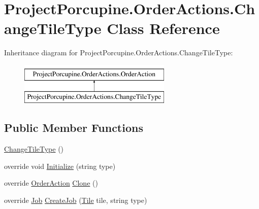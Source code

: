 \hypertarget{class_project_porcupine_1_1_order_actions_1_1_change_tile_type}{}\section{Project\+Porcupine.\+Order\+Actions.\+Change\+Tile\+Type Class Reference}
\label{class_project_porcupine_1_1_order_actions_1_1_change_tile_type}
Inheritance diagram for Project\+Porcupine.\+Order\+Actions.\+Change\+Tile\+Type\+:\begin{figure}[H]
\begin{center}
\leavevmode
\includegraphics[height=2.000000cm]{class_project_porcupine_1_1_order_actions_1_1_change_tile_type}
\end{center}
\end{figure}
\subsection*{Public Member Functions}
\begin{DoxyCompactItemize}
\item 
\hyperlink{class_project_porcupine_1_1_order_actions_1_1_change_tile_type_a063e57330c75d89212d762ca68e7dc03}{Change\+Tile\+Type} ()
\item 
override void \hyperlink{class_project_porcupine_1_1_order_actions_1_1_change_tile_type_aa62d98bcc6471aba77a9c3847e59a993}{Initialize} (string type)
\item 
override \hyperlink{class_project_porcupine_1_1_order_actions_1_1_order_action}{Order\+Action} \hyperlink{class_project_porcupine_1_1_order_actions_1_1_change_tile_type_a6eabfaa08b85dfbed31c79a53f5d65f3}{Clone} ()
\item 
override \hyperlink{class_job}{Job} \hyperlink{class_project_porcupine_1_1_order_actions_1_1_change_tile_type_aa8d1da1aa2599aa6abe5e1c57c541c92}{Create\+Job} (\hyperlink{class_tile}{Tile} tile, string type)
\end{DoxyCompactItemize}
